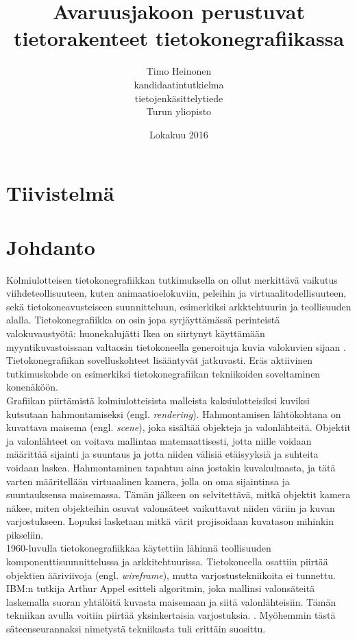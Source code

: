 \documentclass[a4paper, 12pt, titlepage]{article}
\title{Avaruusjakoon perustuvat tietorakenteet tietokonegrafiikassa}
\author{Timo Heinonen \\kandidaatintutkielma \\ tietojenkäsittelytiede \\ Turun yliopisto}
\date{Lokakuu 2016}
\begin{document}


\newpage
{}%
\thispagestyle{empty}
\section*{Tiivistelmä}

\newpage
{}%

\tableofcontents


\newpage
\section{Johdanto}

Kolmiulotteisen tietokonegrafiikkan tutkimuksella on ollut merkittävä vaikutus viihdeteollisuuteen, kuten animaatioelokuviin, peleihin ja virtuaalitodellisuuteen, sekä tietokoneavusteiseen suunnitteluun, esimerkiksi arkktehtuurin ja teollisuuden alalla. \citep{wald04}  Tietokonegrafiikka on osin jopa syrjäyttämässä perinteistä valokuvaustyötä: huonekalujätti Ikea on siirtynyt käyttämään myyntikuvastoissaan valtaosin tietokoneella generoituja kuvia valokuvien sijaan \citep{ikea}. Tietokonegrafiikan sovelluskohteet lisääntyvät jatkuvasti. Eräs aktiivinen tutkimuskohde on esimerkiksi tietokonegrafiikan tekniikoiden soveltaminen konenäköön. \citep[.]{hughes}\\

Grafiikan piirtämistä kolmiulotteisista malleista kaksiulotteisiksi kuviksi kutsutaan hahmontamiseksi (engl. \emph{rendering}). Hahmontamisen lähtökohtana on kuvattava maisema (engl. \emph{scene}), joka sisältää objekteja ja valonlähteitä. Objektit ja valonlähteet on voitava mallintaa matemaattisesti, jotta niille voidaan määrittää sijainti ja suuntaus ja jotta niiden välisiä etäisyyksiä ja suhteita voidaan laskea. Hahmontaminen tapahtuu aina jostakin kuvakulmasta, ja tätä varten määritellään virtuaalinen kamera, jolla on oma sijaintinsa ja suuntauksensa maisemassa. Tämän jälkeen on selvitettävä, mitkä objektit kamera näkee, miten objekteihin osuvat valonsäteet vaikuttavat niiden väriin ja kuvan varjostukseen. Lopuksi lasketaan mitkä värit projisoidaan kuvatason mihinkin pikseliin. \citep[.]{janke}\\

1960-luvulla tietokonegrafiikkaa käytettiin lähinnä teollisuuden komponenttisuunnittelussa ja arkkitehtuurissa. Tietokoneella osattiin piirtää objektien ääriviivoja (engl. \emph{wireframe}), mutta varjostustekniikoita ei tunnettu. IBM:n tutkija Arthur Appel esitteli algoritmin, joka mallinsi valonsäteitä laskemalla suoran yhtälöitä kuvasta maisemaan ja siitä valonlähteisiin. Tämän tekniikan avulla voitiin piirtää yksinkertaisia varjostuksia. \citep[.]{appel}. Myöhemmin tästä säteenseurannaksi nimetystä tekniikasta tuli erittäin suosittu.\\
\end{document}
